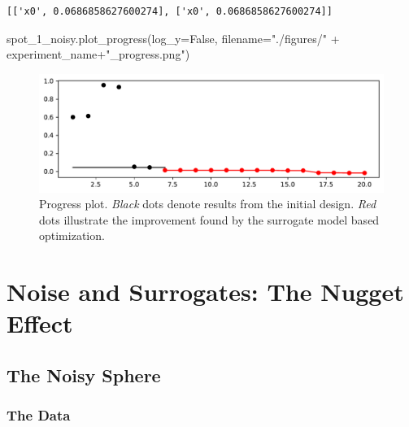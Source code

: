 \documentclass[
  letterpaper,
  DIV=11,
  numbers=noendperiod]{scrreprt}
\newenvironment{Shaded}{\begin{snugshade}}{\end{snugshade}}
\newcommand{\NormalTok}[1]{\textcolor[rgb]{0.00,0.23,0.31}{#1}}
\newcommand{\OperatorTok}[1]{\textcolor[rgb]{0.37,0.37,0.37}{#1}}
\newcommand{\StringTok}[1]{\textcolor[rgb]{0.13,0.47,0.30}{#1}}
\newcommand{\VariableTok}[1]{\textcolor[rgb]{0.07,0.07,0.07}{#1}}
\begin{document}
\begin{verbatim}
[['x0', 0.0686858627600274], ['x0', 0.0686858627600274]]
\end{verbatim}

\begin{Shaded}
\begin{Highlighting}[]
\NormalTok{spot\_1\_noisy.plot\_progress(log\_y}\OperatorTok{=}\VariableTok{False}\NormalTok{,}
\NormalTok{    filename}\OperatorTok{=}\StringTok{"./figures/"} \OperatorTok{+}\NormalTok{ experiment\_name}\OperatorTok{+}\StringTok{"\_progress.png"}\NormalTok{)}
\end{Highlighting}
\end{Shaded}

\begin{figure}[H]

{\centering \includegraphics{013_num_spot_noisy_files/figure-pdf/cell-8-output-1.pdf}

}

\caption{Progress plot. \emph{Black} dots denote results from the
initial design. \emph{Red} dots illustrate the improvement found by the
surrogate model based optimization.}

\end{figure}

\hypertarget{noise-and-surrogates-the-nugget-effect}{%
\section{Noise and Surrogates: The Nugget
Effect}\label{noise-and-surrogates-the-nugget-effect}}

\hypertarget{the-noisy-sphere}{%
\subsection{The Noisy Sphere}\label{the-noisy-sphere}}

\hypertarget{the-data}{%
\subsubsection{The Data}\label{the-data}}
\end{document}
